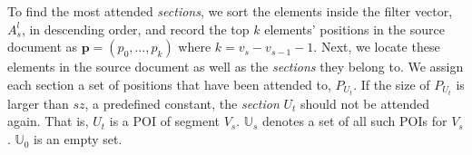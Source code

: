 To find the most attended \textit{sections}, 
we sort the elements inside the filter vector, 
$A_{s}^{l}$, in descending order, 
and record the top $k$ elements' positions in 
the source document as $\mathbf{p}=(p_{0},...,p_{k})$ where
$k=v_{s}-v_{s-1}-1$.
Next, we locate these elements in the source document as well as
the \textit{sections} they belong to. 
We assign each section a set of positions that have been attended to, 
$P_{U_{t}}$. 
If the size of $P_{U_{t}}$ is larger than
$sz$, a predefined constant,
the \textit{section} $U_{t}$ should not be attended again. 
That is, $U_{t}$ is a POI of segment $V_{s}$.
$\mathbb{U}_{s}$ denotes a set of all such POIs for $V_s$.
$\mathbb{U}_{0}$ is an empty set.

